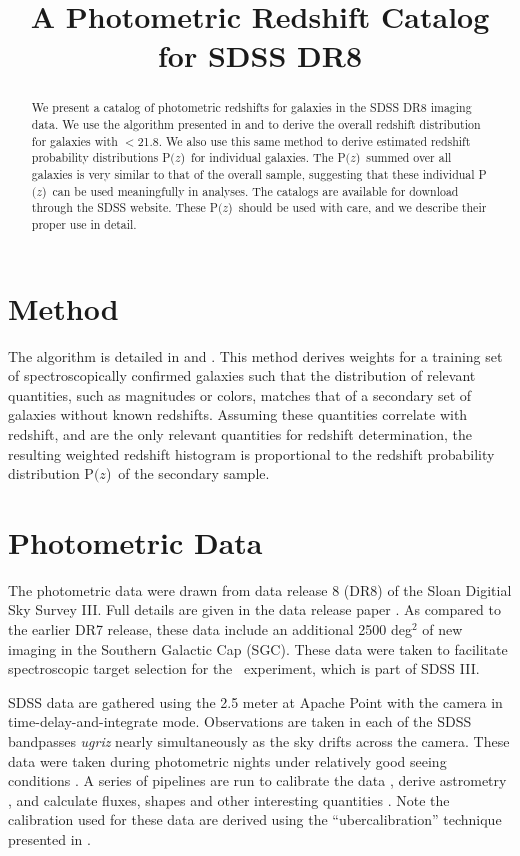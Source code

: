 \documentclass[preprint]{aastex}
\newcommand{\rmax}{21.8}
\newcommand{\pofz}{P$(z$)}
\begin{document}
\title{A Photometric Redshift Catalog for SDSS DR8}



\begin{abstract}

We present a catalog of photometric redshifts for galaxies in the SDSS DR8
imaging data.  We use the algorithm presented in \citet{LimaPhotoz08} and
\citet{CunhaPhotoz09} to derive the overall redshift distribution for galaxies
with \rmag$ < $\rmax.  We also use this same method to derive estimated
redshift probability distributions \pofz\ for individual galaxies.  The \pofz\
summed over all galaxies is very similar to that of the overall sample,
suggesting that these individual \pofz\ can be used meaningfully in analyses.
The catalogs are available for download through the SDSS website.  These \pofz\
should be used with care, and we describe their proper use in detail.

\end{abstract}

\section{Method} \label{sec:method}

The algorithm is detailed in \citet{LimaPhotoz08} and \citet{CunhaPhotoz09}.
This method derives weights for a training set of spectroscopically confirmed
galaxies such that the distribution of relevant quantities, such as magnitudes
or colors, matches that of a secondary set of galaxies without known redshifts.
Assuming these quantities correlate with redshift, and are the only relevant
quantities for redshift determination, the resulting weighted redshift
histogram is proportional to the redshift probability distribution \pofz\ of the
secondary sample. 


\section{Photometric Data}

The photometric data were drawn from data release 8 (DR8) of the Sloan Digitial
Sky Survey III.  Full details are given in the data release paper \citet{dr8}.
As compared to the earlier DR7 release, these data include an additional 2500
deg$^2$ of new imaging in the Southern Galactic Cap (SGC). These data were
taken to facilitate spectroscopic target selection for the \boss\ experiment,
which is part of SDSS III.


SDSS data are gathered using the 2.5 meter at Apache Point \citep{Gunn06} with
the camera \citep{Gunn98} in time-delay-and-integrate mode.  Observations are
taken in each of the SDSS bandpasses {\it ugriz} nearly simultaneously as the
sky drifts across the camera.  These data were taken during photometric nights
under relatively good seeing conditions \citep{Hogg01}.  A series of pipelines
are run to calibrate the data \citep{Nikhil08,Smith02,Tucker06}, derive
astrometry \citep{Pier03}, and calculate fluxes, shapes and other interesting
quantities \citep{LuptonADASS01}.  Note the calibration used for these data are
derived using the ``ubercalibration'' technique presented in \citet{Nikhil08}.
\end{document}
